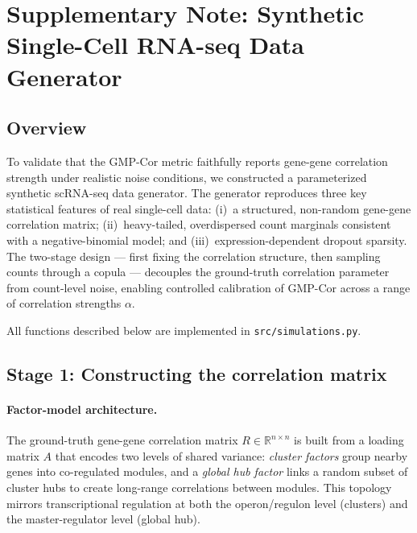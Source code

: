 
\section*{Supplementary Note: Synthetic Single-Cell RNA-seq Data Generator}

\subsection*{Overview}

To validate that the GMP-Cor metric faithfully reports gene-gene correlation strength
under realistic noise conditions, we constructed a parameterized synthetic scRNA-seq
data generator.
The generator reproduces three key statistical features of real single-cell data:
(i)~a structured, non-random gene-gene correlation matrix;
(ii)~heavy-tailed, overdispersed count marginals consistent with a negative-binomial
model; and
(iii)~expression-dependent dropout sparsity.
The two-stage design — first fixing the correlation structure, then sampling counts
through a copula — decouples the ground-truth correlation parameter from count-level
noise, enabling controlled calibration of GMP-Cor across a range of correlation
strengths $\alpha$.

All functions described below are implemented in \texttt{src/simulations.py}.

\subsection*{Stage 1: Constructing the correlation matrix}

\paragraph{Factor-model architecture.}
The ground-truth gene-gene correlation matrix $R \in \mathbb{R}^{n \times n}$ is
built from a loading matrix $A$ that encodes two levels of shared variance:
\emph{cluster factors} group nearby genes into co-regulated modules, and a
\emph{global hub factor} links a random subset of cluster hubs to create long-range
correlations between modules.
This topology mirrors transcriptional regulation at both the operon/regulon level
(clusters) and the master-regulator level (global hub).


